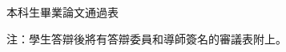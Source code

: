 \clearpage
\thispagestyle{cityu}

\begin{center}
  \vspace*{3.0cm}
  {\fontsize{18pt}{27pt}\selectfont 本科生畢業論文通過表\par}
\end{center}

\vspace{2.0cm}

\noindent
注：學生答辯後將有答辯委員和導師簽名的審議表附上。
